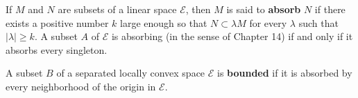 If $M$ and $N$ are subsets of a linear space $\mathcal{E}$, then $M$ is said to \textbf{absorb} $N$ if there exists a positive number $k$ large enough so that $N \subset \lambda M$ for every $\lambda$ such that $|\lambda| \geq k$. A subset $A$ of $\mathcal{E}$ is absorbing (in the sense of Chapter 14) if and only if it absorbs every singleton.

A subset $B$ of a separated locally convex space $\mathcal{E}$ is \textbf{bounded} if it is absorbed by every neighborhood of the origin in $\mathcal{E}$.
